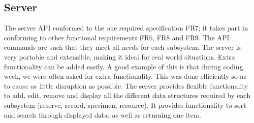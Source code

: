 \subsection{Server}
    The server API conformed to the one required specification FR7; it takes part in conforming to other functional requirements FR6, FR8 and FR9. The API commands are such that they meet all needs for each subsystem. The server is very portable and extensible, making it ideal for real world situations. Extra functionality can be added easily. A good example of this is that during coding week, we were often asked for extra functionality. This was done efficiently so as to cause as little disruption as possible. The server provides flexible functionality to add, edit, remove and display all the different data structures required by each subsystem (reserve, record, specimen, resource). It provides functionality to sort and search through displayed data, as well as returning one item. 


